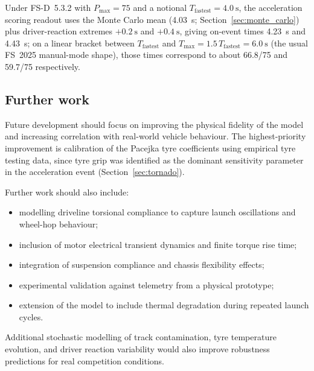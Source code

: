 Under FS-D~5.3.2 with $P_\mathrm{max}=75$ and a notional $T_\text{fastest}=\SI{4.0}{\second}$, the acceleration scoring readout uses the Monte Carlo mean (\SI{4.03}{\second}; Section~\ref{sec:monte_carlo}) plus driver-reaction extremes $+\SI{0.2}{\second}$ and $+\SI{0.4}{\second}$, giving on-event times \SI{4.23}{\second} and \SI{4.43}{\second}; on a linear bracket between $T_\text{fastest}$ and $T_\mathrm{max}=1.5\,T_\text{fastest}=\SI{6.0}{\second}$ (the usual FS~2025 manual-mode shape), those times correspond to about \num{66.8}/75 and \num{59.7}/75 respectively.

\subsection{Further work}
\label{sec:further_work}

Future development should focus on improving the physical fidelity of the model and increasing correlation with real-world vehicle behaviour.
The highest-priority improvement is calibration of the Pacejka tyre coefficients using empirical tyre testing data, since tyre grip was identified as the dominant sensitivity parameter in the acceleration event (Section~\ref{sec:tornado}).

Further work should also include:
\begin{itemize}
    \item modelling driveline torsional compliance to capture launch oscillations and wheel-hop behaviour;
    \item inclusion of motor electrical transient dynamics and finite torque rise time;
    \item integration of suspension compliance and chassis flexibility effects;
    \item experimental validation against telemetry from a physical prototype;
    \item extension of the model to include thermal degradation during repeated launch cycles.
\end{itemize}

Additional stochastic modelling of track contamination, tyre temperature evolution, and driver reaction variability would also improve robustness predictions for real competition conditions.

\compactbib
